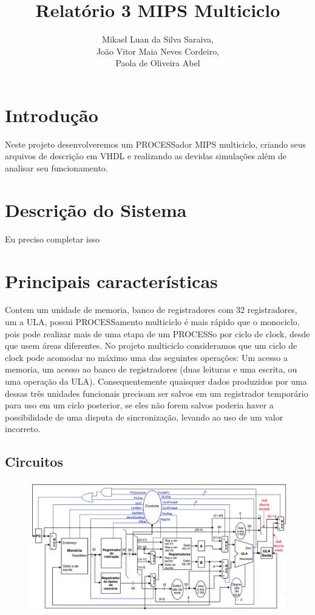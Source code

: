 \documentclass{article}
\title{Relatório 3 \- MIPS Multiciclo}
\author{%
    Mikael Luan da Silva Saraiva, \\
    João Vitor Maia Neves Cordeiro, \\
    Paola de Oliveira Abel
    }
\begin{document}
    \maketitle

    \section{Introdução}

    Neste projeto desenvolveremos um PROCESSador MIPS multiciclo, criando seus
    arquivos de descrição em VHDL e realizando as devidas simulações além de
    analisar seu funcionamento.

    \section{Descrição do Sistema}

    Eu preciso completar isso

    \section{Principais características}

    Contem um unidade de memoria, banco de registradores com 32 registradores,
    um a ULA, possui PROCESSamento multiciclo é mais rápido que o monociclo,
    pois pode realizar mais de uma etapa de um PROCESSo por ciclo de clock,
    desde que usem áreas diferentes. No projeto multiciclo consideramos que um
    ciclo de clock pode acomodar no máximo uma das seguintes operações: Um
    acesso a memoria, um acesso ao banco de registradores (duas leituras e uma
    escrita, ou uma operação da ULA). Consequentemente quaisquer dados
    produzidos por uma dessas três unidades funcionais precisam ser salvos em
    um registrador temporário para uso em um ciclo posterior, se eles não forem
    salvos poderia haver a possibilidade de uma disputa de sincronização,
    levando ao uso de um valor incorreto.

    \subsection{Circuitos}

    \begin{figure}[H]
        \centering %
        \includegraphics[width=\textwidth]{circuito_mips.png} %
        \label{figura:mips}
    \end{figure}
\end{document}
